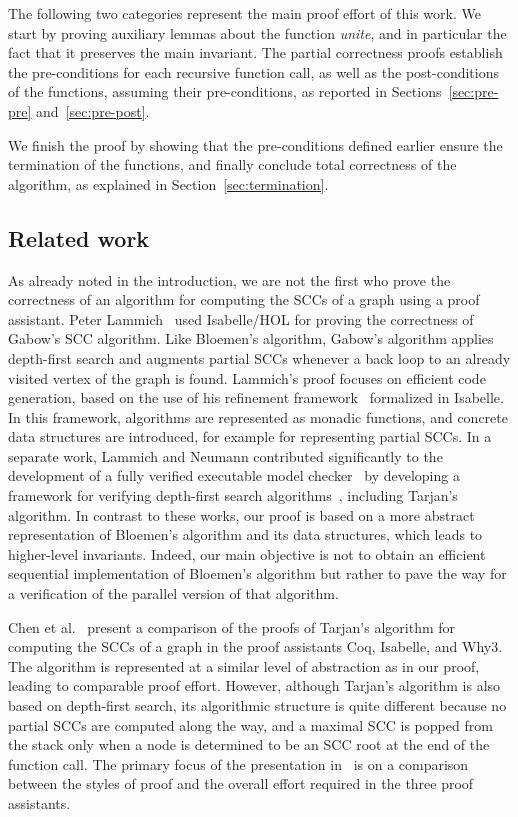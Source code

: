 \documentclass[sigplan,10pt,anonymous,review]{acmart}
\newcommand{\prog}[1]{\textit{#1}}
\begin{document}
The following two categories represent the main proof effort of this work. We start by proving auxiliary lemmas about the function \prog{unite}, and in particular the fact that it preserves the main invariant. The partial correctness proofs establish the pre-conditions for each recursive function call, as well as the post-conditions of the functions, assuming their pre-conditions, as reported in Sections~\ref{sec:pre-pre} and~\ref{sec:pre-post}.

We finish the proof by showing that the pre-conditions defined earlier ensure the termination of the functions, and finally conclude total correctness of the algorithm, as explained in Section~\ref{sec:termination}.


\subsection{Related work}
\label{sec:related}

As already noted in the introduction, we are not the first who prove the correctness of an algorithm for computing the SCCs of a graph using a proof assistant. Peter Lammich~\cite{lammich:gabow} used Isabelle/HOL for proving the correctness of Gabow's SCC algorithm. Like Bloemen's algorithm, Gabow's algorithm applies depth-first search and augments partial SCCs whenever a back loop to an already visited vertex of the graph is found. Lammich's proof focuses on efficient code generation, based on the use of his refinement framework~\cite{lammich:refinement} formalized in Isabelle. In this framework, algorithms are represented as monadic functions, and concrete data structures are introduced, for example for representing partial SCCs. In a separate work, Lammich and Neumann contributed significantly to the development of a fully verified executable model checker~\cite{esparza:cava} by developing a framework for verifying depth-first search algorithms~\cite{lammich:depth-first}, including Tarjan's algorithm. In contrast to these works, our proof is based on a more abstract representation of Bloemen's algorithm and its data structures, which leads to higher-level invariants. Indeed, our main objective is not to obtain an efficient sequential implementation of Bloemen's algorithm but rather to pave the way for a verification of the parallel version of that algorithm.

Chen et al.~\cite{chen:tarjan} present a comparison of the proofs of Tarjan's algorithm for computing the SCCs of a graph in the proof assistants Coq, Isabelle, and Why3. The algorithm is represented at a similar level of abstraction as in our proof, leading to comparable proof effort. However, although Tarjan's algorithm is also based on depth-first search, its algorithmic structure is quite different because no partial SCCs are computed along the way, and a maximal SCC is popped from the stack only when a node is determined to be an SCC root at the end of the function call. The primary focus of the presentation in~\cite{chen:tarjan} is on a comparison between the styles of proof and the overall effort required in the three proof assistants.
\end{document}
